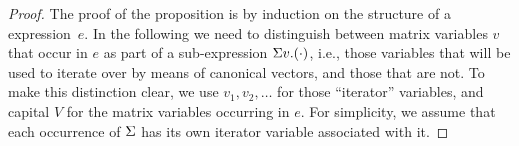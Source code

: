 
\begin{proof}
%
%
%
%
%
The proof of the proposition is by induction on the structure of a \langsum expression~$e$. In the following we need to distinguish between matrix variables $v$
that occur in $e$ as part of a sub-expression $\Sigma v. (\cdot)$, i.e., those variables that will be used to iterate over by means of canonical vectors, and those that are not. To make this distinction clear, we use $v_1,v_2,\ldots$ for those ``iterator'' variables, and capital $V$ for the matrix variables occurring in $e$. For simplicity, we assume that each occurrence of $\Sigma$ has its own iterator variable associated with it. 


\end{proof}
